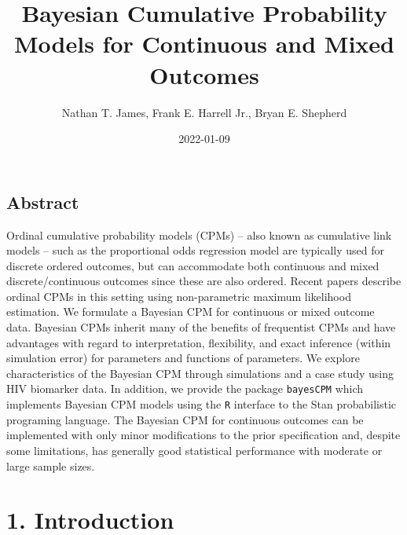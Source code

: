 \documentclass[
]{article}
\title{Bayesian Cumulative Probability Models for Continuous and Mixed Outcomes}
\author{Nathan T. James, Frank E. Harrell Jr., Bryan E. Shepherd}
\date{2022-01-09}
\begin{document}
\maketitle

\hypertarget{abstract}{%
\subsection{Abstract}\label{abstract}}

Ordinal cumulative probability models (CPMs) -- also known as cumulative link models -- such as the proportional odds regression model are typically used for discrete ordered outcomes, but can accommodate both continuous and mixed discrete/continuous outcomes since these are also ordered. Recent papers describe ordinal CPMs in this setting using non-parametric maximum likelihood estimation. We formulate a Bayesian CPM for continuous or mixed outcome data. Bayesian CPMs inherit many of the benefits of frequentist CPMs and have advantages with regard to interpretation, flexibility, and exact inference (within simulation error) for parameters and functions of parameters. We explore characteristics of the Bayesian CPM through simulations and a case study using HIV biomarker data. In addition, we provide the package \texttt{bayesCPM} which implements Bayesian CPM models using the \texttt{R} interface to the Stan probabilistic programing language. The Bayesian CPM for continuous outcomes can be implemented with only minor modifications to the prior specification and, despite some limitations, has generally good statistical performance with moderate or large sample sizes.

\hypertarget{introduction}{%
\section{1. Introduction}\label{introduction}}
\end{document}
